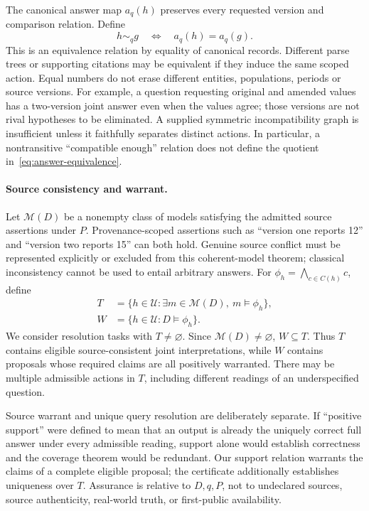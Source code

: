 The canonical answer map $a_q(h)$ preserves every requested version and
comparison relation. Define
\begin{equation}
 h\sim_q g\quad\Longleftrightarrow\quad a_q(h)=a_q(g).
 \label{eq:answer-equivalence}
\end{equation}
This is an equivalence relation by equality of canonical records. Different
parse trees or supporting citations may be equivalent if they induce the same
scoped action. Equal numbers do not erase different entities, populations,
periods or source versions. For example, a question requesting original and
amended values has a two-version joint answer even when the values agree;
those versions are not rival hypotheses to be eliminated. A supplied symmetric
incompatibility graph is insufficient unless it faithfully separates distinct
actions. In particular, a nontransitive ``compatible enough'' relation does
not define the quotient in~\eqref{eq:answer-equivalence}.

\paragraph{Source consistency and warrant.}
Let $\mathcal M(D)$ be a nonempty class of models satisfying the admitted source
assertions under $P$. Provenance-scoped assertions such as ``version one reports
12'' and ``version two reports 15'' can both hold. Genuine source conflict must
be represented explicitly or excluded from this coherent-model theorem;
classical inconsistency cannot be used to entail arbitrary answers. For
$\phi_h=\bigwedge_{c\in C(h)}c$, define
\begin{align}
 T&=\{h\in\mathcal U:\exists m\in\mathcal M(D),\ m\models\phi_h\},
 \label{eq:consistent-hypotheses}\\
 W&=\{h\in\mathcal U:D\models\phi_h\}.
 \label{eq:warranted-hypotheses}
\end{align}
We consider resolution tasks with $T\ne\varnothing$. Since
$\mathcal M(D)\ne\varnothing$, $W\subseteq T$. Thus $T$ contains eligible
source-consistent joint interpretations, while $W$ contains proposals whose
required claims are all positively warranted. There may be multiple admissible
actions in $T$, including different readings of an underspecified question.

Source warrant and unique query resolution are deliberately separate. If
``positive support'' were defined to mean that an output is already the
uniquely correct full answer under every admissible reading, support alone
would establish correctness and the coverage theorem would be redundant. Our
support relation warrants the claims of a complete eligible proposal; the
certificate additionally establishes uniqueness over $T$. Assurance is
relative to $D,q,P$, not to undeclared sources, source authenticity, real-world
truth, or first-public availability.

